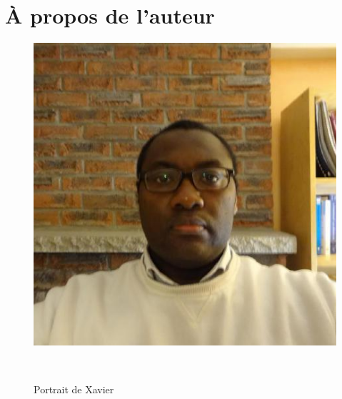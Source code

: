 \chapter*{\`A propos de l'auteur}\label{chap:biography}

\begin{figure}[!htpb]
\centering
\includegraphics[scale=0.63]{images/XavierNOUNDOU-2}
\caption{Portrait de Xavier}~\label{fig:xaviernoumbis}
\end{figure}
